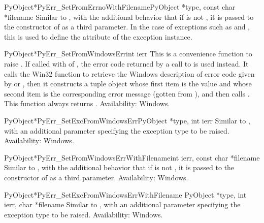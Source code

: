 \begin{cfuncdesc}{PyObject*}{PyErr_SetFromErrnoWithFilename}{PyObject *type,
                                                             const char *filename}
  Similar to , with the additional
  behavior that if  is not \NULL, it is passed to the
  constructor of  as a third parameter.  In the case of
  exceptions such as  and , this
  is used to define the  attribute of the exception
  instance.
\end{cfuncdesc}

\begin{cfuncdesc}{PyObject*}{PyErr_SetFromWindowsErr}{int ierr}
  This is a convenience function to raise .
  If called with  of , the error code returned by a
  call to  is used instead.  It calls the
  Win32 function  to retrieve the Windows
  description of error code given by  or
  , then it constructs a tuple object whose
  first item is the  value and whose second item is the
  corresponding error message (gotten from
  ), and then calls
  .
  This function always returns \NULL.
  Availability: Windows.
\end{cfuncdesc}

\begin{cfuncdesc}{PyObject*}{PyErr_SetExcFromWindowsErr}{PyObject *type,
	                                                 int ierr}
  Similar to , with an additional
  parameter specifying the exception type to be raised.
  Availability: Windows.
\end{cfuncdesc}

\begin{cfuncdesc}{PyObject*}{PyErr_SetFromWindowsErrWithFilename}{int ierr,
                                                                const char *filename}
  Similar to , with the
  additional behavior that if  is not \NULL, it is
  passed to the constructor of  as a third
  parameter.
  Availability: Windows.
\end{cfuncdesc}

\begin{cfuncdesc}{PyObject*}{PyErr_SetExcFromWindowsErrWithFilename}
	{PyObject *type, int ierr, char *filename}
  Similar to , with
  an additional parameter specifying the exception type to be raised.
  Availability: Windows.
\end{cfuncdesc}

